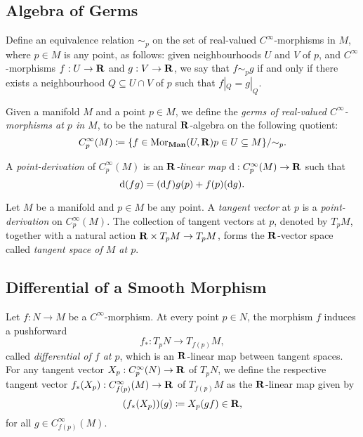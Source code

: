 \subsection{Algebra of Germs}

Define an equivalence relation \(\sim_p\) on the set of real-valued
\(C^{\infty}\)-morphisms in \(M\), where \(p \in M\) is any point, as follows:
given neighbourhoods \(U\) and \(V\) of \(p\), and \(C^{\infty}\)-morphisms
\(f: U \to \mathbf{R}\) and \(g: V \to \mathbf{R}\), we say that \(f \sim_p g\) if and only if
there exists a neighbourhood \(Q \subseteq U \cap V\) of \(p\) such that
\(f|_Q = g|_Q\).

\begin{definition}
\label{def:algebra-of-germs-manifold}
Given a manifold \(M\) and a point \(p \in M\), we define the \emph{germs of
  real-valued \(C^{\infty}\)-morphisms at \(p\) in \(M\)}, to be the natural
\(\mathbf{R}\)-algebra on the following quotient:
\[
C_p^{\infty}(M) \coloneq
\{f \in \operatorname{Mor}_{{\textbf{Man}}}(U, \mathbf{R}) \relax p \in U \subseteq M\}/{\sim_p}.
\]

A \emph{point-derivation} of \(C_p^{\infty}(M)\) is an \emph{\(\mathbf{R}\)-linear map}
\(\mathrm{d}: C_p^{\infty}(M) \to \mathbf{R}\) such that
\[
\mathrm{d}(f g) = (\mathrm{d} f) g(p) + f(p) (\mathrm{d} g).
\]
\end{definition}

\begin{definition}
\label{def:tangent-vector-at-point-manifold}
Let \(M\) be a manifold and \(p \in M\) be any point. A \emph{tangent vector} at
\(p\) is a \emph{point-derivation} on \(C_p^{\infty}(M)\). The collection of
tangent vectors at \(p\), denoted by \(T_p M\), together with a natural action
\(\mathbf{R} \times T_p M \to T_p M\), forms the \(\mathbf{R}\)-vector space called
\emph{tangent space of \(M\) at \(p\)}.
\end{definition}

\subsection{Differential of a Smooth Morphism}

\begin{definition}
\label{def:differential-at-a-point}
Let \(f: N \to M\) be a \(C^{\infty}\)-morphism. At every point \(p \in N\), the
morphism \(f\) induces a pushforward
\[
f_{*}: T_p N \longrightarrow T_{f(p)} M,
\]
called \emph{differential of \(f\) at \(p\)}, which is an \(\mathbf{R}\)-linear map
between tangent spaces. For any tangent vector \(X_p: C_p^{\infty}(N) \to \mathbf{R}\) of
\(T_p N\), we define the respective tangent vector
\(f_{*}(X_p): C_{f(p)}^{\infty}(M) \to \mathbf{R}\) of \(T_{f(p)} M\) as the
\(\mathbf{R}\)-linear map given by
\[
(f_{*}(X_p))(g) \coloneq X_p(g f) \in \mathbf{R},
\]
for all \(g \in C_{f(p)}^{\infty}(M)\).
\end{definition}

